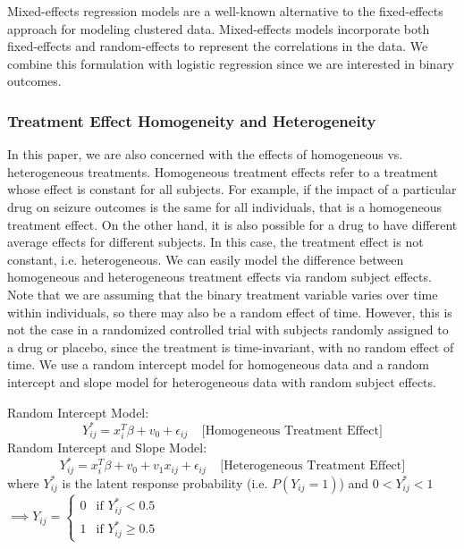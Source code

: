 \documentclass{article}
\begin{document}
    Mixed-effects regression models are a well-known alternative to the fixed-effects approach for modeling clustered data. Mixed-effects models incorporate both fixed-effects and random-effects to represent the correlations in the data. We combine this formulation with logistic regression since we are interested in binary outcomes. 
    \subsubsection{Treatment Effect Homogeneity and Heterogeneity}
    In this paper, we are also concerned with the effects of homogeneous vs. heterogeneous treatments. Homogeneous treatment effects refer to a treatment whose effect is constant for all subjects. For example, if the impact of a particular drug on seizure outcomes is the same for all individuals, that is a homogeneous treatment effect. On the other hand, it is also possible for a drug to have different average effects for different subjects. In this case, the treatment effect is not constant, i.e. heterogeneous. We can easily model the difference between homogeneous and heterogeneous treatment effects via random subject effects. Note that we are assuming that the binary treatment variable varies over time within individuals, so there may also be a random effect of time. However, this is not the case in a randomized controlled trial with subjects randomly assigned to a drug or placebo, since the treatment is time-invariant, with no random effect of time. We use a random intercept model for homogeneous data and a random intercept and slope model for heterogeneous data with random subject effects. 

    \noindent Random Intercept Model:
    \begin{equation}
        Y_{ij}^* = x_i^T\beta + v_0 + \epsilon_{ij} \;\;\;\; \text{[Homogeneous Treatment Effect]}
    \end{equation}
    Random Intercept and Slope Model:
    \begin{equation}
        Y_{ij}^* = x_i^T\beta + v_0 + v_1x_{ij} + \epsilon_{ij} \;\;\;\; \text{[Heterogeneous Treatment Effect]}
    \end{equation} 
    where $Y_{ij}^*$ is the latent response probability (i.e. $P(Y_{ij} = 1)$) and $ 0 < Y_{ij}^* < 1$   $\implies Y_{ij} = 
        \begin{cases}
            0 & \text{if } Y_{ij }^* < 0.5\\    
            1 & \text{if } Y_{ij }^* \ge 0.5    
        \end{cases}$ 
\end{document}
